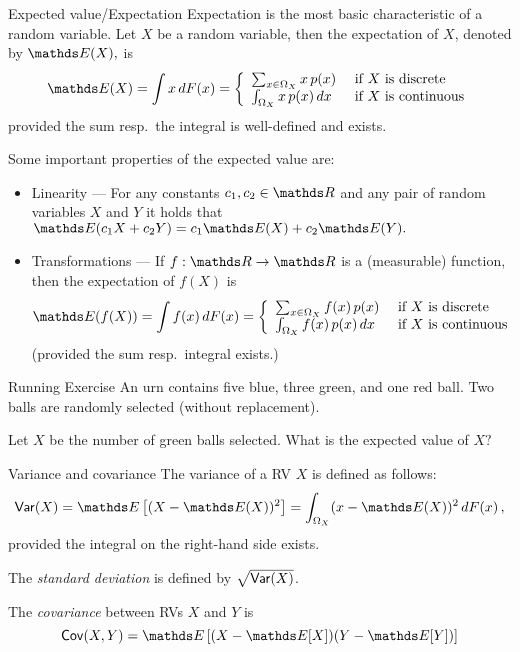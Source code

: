 \begin{frame}[t]{Expected value/Expectation} 
%	
	Expectation is the most basic characteristic of a random variable. Let $X$ be a random variable, then the expectation of $X$, denoted by $\E(X),$ is 
	$$	\E(X) = \int x \, dF(x) = \left\{ \begin{array}{ll}
		\sum_{x \in \Omega_X} x \, p(x) & \text{ if } X \text{ is discrete} \\
		\int_{\Omega_X} x \, p(x) \, dx& \text{ if } X \text{ is continuous} 
	\end{array} \right.  	$$
 provided the sum resp.\ the integral is well-defined and exists.
	
	Some important properties of the expected value are:
	\begin{itemize}
		\item Linearity --- For any constants $c_1,c_2 \in \R$ and any pair of random variables $X$ and $Y$ it holds that $ \E(c_1 X + c_2 Y) = c_1 \E(X) + c_2 \E(Y).$
		\item Transformations --- If $f:\R \to \R$  is a (measurable) function, then the expectation of $f(X)$ is 
		$$\E(f(X)) = \int f(x) \, dF(x) = \left\{ \begin{array}{ll}
			\sum_{x \in \Omega_X} f(x) \, p(x) & \text{ if } X \text{ is discrete} \\
			\int_{\Omega_X} f(x) \, p(x) \, dx& \text{ if } X \text{ is continuous} 
		\end{array} \right.  	$$   
		{\tiny (provided the sum resp.\ integral exists.)}
	\end{itemize}
\end{frame}


\begin{vbframe}{Running Exercise}  
	An urn contains five blue, three green, and one red ball. Two balls are randomly selected (without replacement).
	
	\lz
	
	
	
	Let $X$ be the number of green balls selected. What is the expected value of $X?$
	
	 
	
	
	
\end{vbframe}


\begin{vbframe}{Variance and covariance}
%	 
		The variance of a RV $X$ is defined as follows:
		$$
		\var(X) = \E \left[ (X - \E(X))^2 \right] = \int_{\Omega_X} (x-\E(X))^2  \, dF(x)  \, ,
		$$
		provided the integral on the right-hand side exists. 
		
		\lz
		 
		The \emph{standard deviation} is defined by $\sqrt{\mathsf{Var}(X)}$.
		
		
		\lz
		 
		The \emph{covariance} between RVs $X$ and $Y$ is  
		$$
		\cov(X,Y) = \E \left[  (X- \E[X]) (Y - \E[Y]) \right]
		$$
%		 
\end{vbframe}



